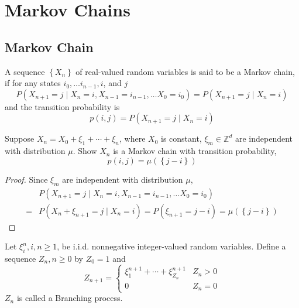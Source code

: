 \chapter{Markov Chains}

\section{Markov Chain}

\begin{definition}
	A sequence $\left\{X_{n}\right\}$ of real-valued random variables  is said to be a Markov chain, if for any states $i_{0},\ldots i_{n-1},i$, and $j$
	\begin{equation}
		P\left(X_{n+1}=j\mid X_{n}=i,X_{n-1}=i_{n-1},\ldots X_{0}=i_{0}\right)=P\left(X_{n+1}=j\mid X_{n}=i\right)
	\end{equation}
	and the transition probability is
	\begin{equation}
		p(i,j)=P\left(X_{n+1}=j\mid X_{n}=i\right)
	\end{equation}
\end{definition}

\begin{example}
	Suppose $X_{n}=X_{0}+\xi_{1}+\cdots+\xi_{n}$, where $X_{0}$ is constant, $\xi_{m}\in\mathbb{Z}^{d}$ are independent with distribution $\mu$. Show $X_{n}$ is a Markov chain with transition probability,
	\begin{equation*}
		p\left(i,j\right)=\mu\left(\left\{j-i\right\}\right)
	\end{equation*}
\end{example}

\begin{proof}
	Since $\xi_{m}$ are independent with distribution $\mu$,
	\begin{equation*}
		\begin{aligned}
			  & P\left(X_{n+1}=j\mid X_{n}=i,X_{n-1}=i_{n-1},\ldots X_{0}=i_{0}\right)                                     \\
			= & P\left(X_{n}+\xi_{n+1}=j\mid X_{n}=i\right)=P\left(\xi_{n+1}=j-i\right)=\mu\left(\left\{j-i\right\}\right)
		\end{aligned}
	\end{equation*}
\end{proof}

\begin{definition}
	Let $\xi_{i}^{n},i,n\geq 1$, be i.i.d. nonnegative integer-valued random variables. Define a sequence $Z_{n},n\geq 0$ by $Z_{0}=1$ and
	\begin{equation}
		Z_{n+1}=\left\{\begin{array}{ll}
			\xi_{1}^{n+1}+\cdots+\xi_{Z_{n}}^{n+1} & Z_{n}>0 \\
			0                                      & Z_{n}=0
		\end{array}\right.
	\end{equation}
	$Z_{n}$ is called a Branching process.
\end{definition}

